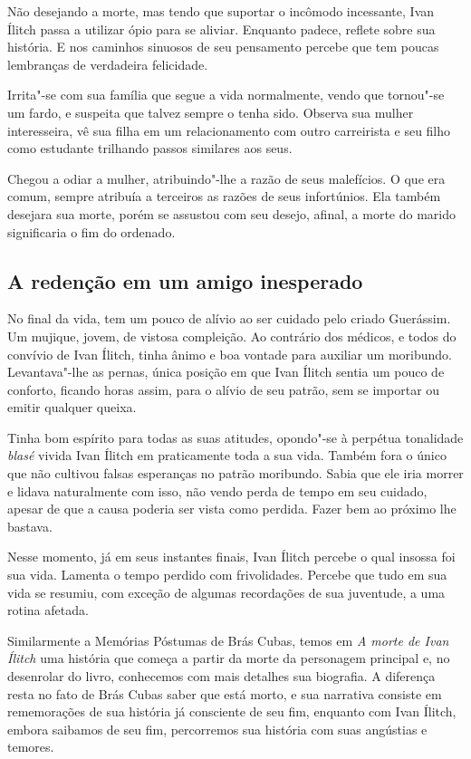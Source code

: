 \documentclass[12pt]{extarticle}
\begin{document}
Não desejando a morte, mas tendo que suportar o incômodo incessante,
Ivan Ílitch passa a utilizar ópio para se aliviar. Enquanto padece,
reflete sobre sua história. E nos caminhos sinuosos de seu pensamento
percebe que tem poucas lembranças de verdadeira felicidade.

Irrita"-se com sua família que segue a vida normalmente, vendo que
tornou"-se um fardo, e suspeita que talvez sempre o tenha sido. Observa
sua mulher interesseira, vê sua filha em um relacionamento com outro
carreirista e seu filho como estudante trilhando passos similares aos
seus.

Chegou a odiar a mulher, atribuindo"-lhe a razão de seus malefícios. O
que era comum, sempre atribuía a terceiros as razões de seus
infortúnios. Ela também desejara sua morte, porém se assustou com seu
desejo, afinal, a morte do marido significaria o fim do ordenado.

\subsection{A redenção em um amigo inesperado}

No final da vida, tem um pouco de alívio ao ser cuidado pelo criado
Guerássim. Um mujique, jovem, de vistosa compleição. Ao contrário dos
médicos, e todos do convívio de Ivan Ílitch, tinha ânimo e boa vontade
para auxiliar um moribundo. Levantava"-lhe as pernas, única posição em
que Ivan Ílitch sentia um pouco de conforto, ficando horas assim,
para o alívio de seu patrão, sem se importar ou emitir qualquer queixa.




Tinha bom espírito para todas as suas atitudes, opondo"-se à perpétua
tonalidade \emph{blasé} vivida Ivan Ílitch em praticamente toda a sua
vida. Também fora o único que não cultivou falsas esperanças no patrão
moribundo. Sabia que ele iria morrer e lidava naturalmente com isso, não
vendo perda de tempo em seu cuidado, apesar de que a causa poderia ser
vista como perdida. Fazer bem ao próximo lhe bastava.

Nesse momento, já em seus instantes finais, Ivan Ílitch percebe o qual
insossa foi sua vida. Lamenta o tempo perdido com
frivolidades. Percebe que tudo em
sua vida se resumiu, com exceção de algumas recordações de sua juventude,
a uma rotina afetada.

Similarmente a Memórias Póstumas de Brás Cubas, temos em 
\emph{A morte de Ivan Ílitch} uma história que começa 
a partir da morte da personagem principal
e, no desenrolar do livro, conhecemos com mais detalhes sua biografia. A
diferença resta no fato de Brás Cubas saber que está morto, e sua narrativa
consiste em rememorações de sua história já consciente de seu fim,
enquanto com Ivan Ílitch, embora saibamos de seu fim, percorremos sua
história com suas angústias e temores.
\end{document}
